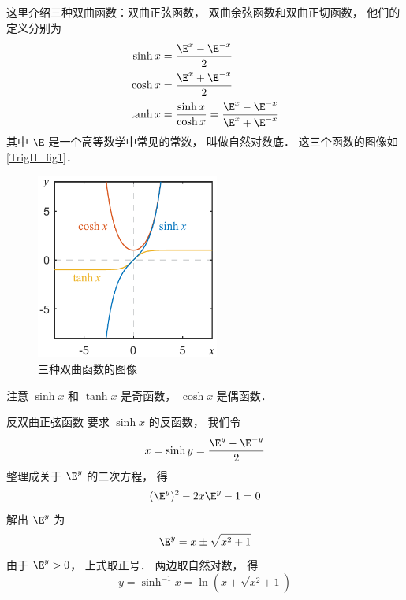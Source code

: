 

这里介绍三种双曲函数：双曲正弦函数， 双曲余弦函数和双曲正切函数， 他们的定义分别为
\begin{align}
\sinh x &= \frac{\E^x - \E^{-x}}{2}\\
\cosh x &= \frac{\E^x + \E^{-x}}{2}\\
\tanh x &= \frac{\sinh x}{\cosh x} = \frac{\E^x - \E^{-x}}{\E^x + \E^{-x}}
\end{align}
其中 $\E$ 是一个高等数学中常见的常数， 叫做自然对数底． 这三个函数的图像如\autoref{TrigH_fig1}．

\begin{figure}[ht]
\centering
\includegraphics[width=6cm]{./figures/TrigH1.pdf}
\caption{三种双曲函数的图像} \label{TrigH_fig1}
\end{figure}

注意 $\sinh x$ 和 $\tanh x$ 是奇函数， $\cosh x$ 是偶函数．

\begin{exam}{反双曲正弦函数}\label{TrigH_ex1}
要求 $\sinh x$ 的反函数， 我们令
\begin{equation}
x = \sinh y =  \frac{\E^y - \E^{-y}}{2}
\end{equation}
整理成关于 $\E^y$ 的二次方程， 得
\begin{equation}
(\E^y)^2 - 2x \E^y - 1 = 0
\end{equation}
解出 $\E^y$ 为
\begin{equation}
\E^y = x \pm \sqrt{x^2 + 1}
\end{equation}
由于 $\E^y > 0$， 上式取正号． 两边取自然对数， 得
\begin{equation}
y = \sinh^{-1} x = \ln(x + \sqrt{x^2 + 1})
\end{equation}
\end{exam}
